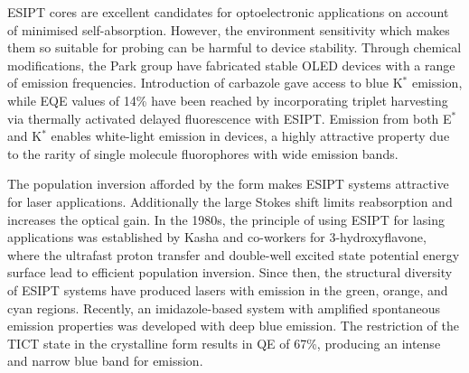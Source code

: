 \ac{ESIPT} cores are excellent candidates for optoelectronic applications on account of minimised self-absorption. However, the environment sensitivity which makes them so suitable for probing can be harmful to device stability.\cite{Kwon2011} Through chemical modifications, the Park group have fabricated stable \ac{OLED} devices with a range of emission frequencies.\cite{Park2008,Park2009,Kim2011} Introduction of carbazole gave access to blue K$^*$ emission, while \ac{EQE} values of 14\% have been reached by incorporating triplet harvesting via thermally activated delayed fluorescence with \ac{ESIPT}.\cite{Park2008,Mamada2017} Emission from both E$^*$ and K$^*$ enables white-light emission in devices, a highly attractive property due to the rarity of single molecule fluorophores with wide emission bands.\cite{Tang2011,Yao2011,Zhang2016b,Serdiuk2017}

The population inversion afforded by the \Kstar form makes \ac{ESIPT} systems attractive for laser applications.\cite{Fang2014,Gierschner2016} Additionally the large Stokes shift limits reabsorption and increases the optical gain.\cite{Kwon2011} In the 1980s, the principle of using \ac{ESIPT} for lasing applications was established by Kasha and co-workers for 3-hydroxyflavone, where the ultrafast proton transfer and double-well excited state potential energy surface lead to efficient population inversion.\cite{Khan1983,Chou1984} Since then, the structural diversity of \ac{ESIPT} systems have produced lasers with emission in the green, orange, and cyan regions.\cite{Sakai2016,Chen2016,Park2012,Park2008} Recently, an imidazole-based system with amplified spontaneous emission properties was developed with deep blue emission.\cite{Park2017} The restriction of the \ac{TICT} state in the crystalline form results in \ac{QE} of 67\%, producing an intense and narrow blue band for emission. 
